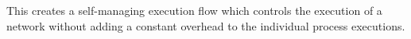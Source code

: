 This creates a self-managing execution flow which controls the
execution of a network without adding a constant overhead to the
individual process executions.
















